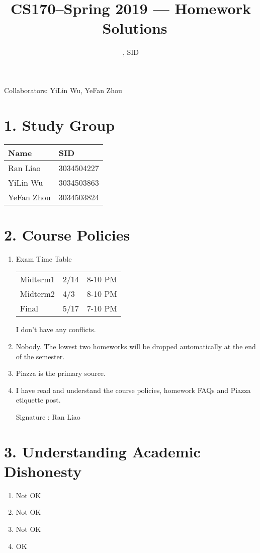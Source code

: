 \documentclass[11pt]{article}
\title{CS170--Spring 2019 --- Homework \Homework\ Solutions}
\author{\Name, SID \SID}
\date{}
\newenvironment{qparts}{\begin{enumerate}[{(}a{)}]}{\end{enumerate}}
\begin{document}
\maketitle
Collaborators: YiLin Wu, YeFan Zhou

\section*{1. Study Group}
\begin{tabular}{ll}
    Name        &   SID         \\\hline
    Ran Liao    &   3034504227  \\  
    YiLin Wu    &   3034503863  \\
    YeFan Zhou  &   3034503824 
\end{tabular}

\newpage
\section*{2. Course Policies}
\begin{qparts}
\item Exam Time Table

\begin{tabular}{lll}
    Midterm1    &   2/14    &   8-10 PM     \\   
    Midterm2    &   4/3     &   8-10 PM     \\   
    Final       &   5/17    &   7-10 PM     \\   
\end{tabular}

I don't have any conflicts.

\item Nobody. The lowest two homeworks will be dropped automatically at the end of the semester.

\item Piazza is the primary source.

\item I have read and understand the course policies, homework FAQs and Piazza etiquette post.

Signature : Ran Liao

\end{qparts}

\newpage
\section*{3. Understanding Academic Dishonesty}
\begin{qparts}
\item Not OK
\item Not OK
\item Not OK
\item OK

\end{qparts}
\end{document}
